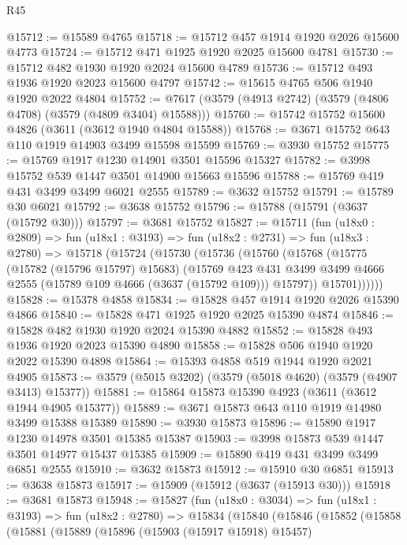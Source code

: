 \begin{lexlean}{R45}
\begin{coremodule}
@15712 := @15589 @4765
@15718 := @15712 @457 @1914 @1920 @2026 @15600 @4773
@15724 := @15712 @471 @1925 @1920 @2025 @15600 @4781
@15730 := @15712 @482 @1930 @1920 @2024 @15600 @4789
@15736 := @15712 @493 @1936 @1920 @2023 @15600 @4797
@15742 := @15615 @4765 @506 @1940 @1920 @2022 @4804
@15752 := @7617 (@3579 (@4913 @2742) (@3579 (@4806 @4708) (@3579 (@4809 @3404) @15588)))
@15760 := @15742 @15752 @15600 @4826 (@3611 (@3612 @1940 @4804 @15588))
@15768 := @3671 @15752 @643 @110 @1919 @14903 @3499 @15598 @15599
@15769 := @3930 @15752
@15775 := @15769 @1917 @1230 @14901 @3501 @15596 @15327
@15782 := @3998 @15752 @539 @1447 @3501 @14900 @15663 @15596
@15788 := @15769 @419 @431 @3499 @3499 @6021 @2555
@15789 := @3632 @15752
@15791 := @15789 @30 @6021
@15792 := @3638 @15752
@15796 := @15788 (@15791 (@3637 (@15792 @30)))
@15797 := @3681 @15752
@15827 := @15711
    (fun (u18x0 : @2809) =>
    fun (u18x1 : @3193) =>
    fun (u18x2 : @2731) =>
    fun (u18x3 : @2780) =>
    @15718
      (@15724
        (@15730
          (@15736
            (@15760
              (@15768
                (@15775
                  (@15782 (@15796 @15797) @15683)
                  (@15769
                    @423
                    @431
                    @3499
                    @3499
                    @4666
                    @2555
                    (@15789 @109 @4666 (@3637 (@15792 @109)))
                    @15797))
                @15701))))))
@15828 := @15378 @4858
@15834 := @15828 @457 @1914 @1920 @2026 @15390 @4866
@15840 := @15828 @471 @1925 @1920 @2025 @15390 @4874
@15846 := @15828 @482 @1930 @1920 @2024 @15390 @4882
@15852 := @15828 @493 @1936 @1920 @2023 @15390 @4890
@15858 := @15828 @506 @1940 @1920 @2022 @15390 @4898
@15864 := @15393 @4858 @519 @1944 @1920 @2021 @4905
@15873 := @3579 (@5015 @3202) (@3579 (@5018 @4620) (@3579 (@4907 @3413) @15377))
@15881 := @15864 @15873 @15390 @4923 (@3611 (@3612 @1944 @4905 @15377))
@15889 := @3671 @15873 @643 @110 @1919 @14980 @3499 @15388 @15389
@15890 := @3930 @15873
@15896 := @15890 @1917 @1230 @14978 @3501 @15385 @15387
@15903 := @3998 @15873 @539 @1447 @3501 @14977 @15437 @15385
@15909 := @15890 @419 @431 @3499 @3499 @6851 @2555
@15910 := @3632 @15873
@15912 := @15910 @30 @6851
@15913 := @3638 @15873
@15917 := @15909 (@15912 (@3637 (@15913 @30)))
@15918 := @3681 @15873
@15948 := @15827
    (fun (u18x0 : @3034) =>
    fun (u18x1 : @3193) =>
    fun (u18x2 : @2780) =>
    @15834
      (@15840
        (@15846
          (@15852
            (@15858
              (@15881
                (@15889
                  (@15896
                    (@15903 (@15917 @15918) @15457)

\end{coremodule}
\end{lexlean}
